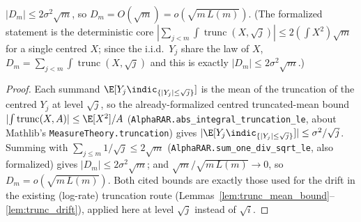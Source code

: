 \begin{lemma}\label{lem:hw_drift}
\leanok
{}
$|D_m|\le2\sigma^2\sqrt m$, so $D_m=O(\sqrt m)=o(\sqrt{m\,L(m)})$. (The formalized statement is the
deterministic core $|\sum_{j<m}\!\int\operatorname{trunc}(X,\sqrt j)|\le2(\int X^2)\sqrt m$ for a
single centred $X$; since the i.i.d.\ $Y_j$ share the law of $X$, $D_m=\sum_{j<m}\!\int
\operatorname{trunc}(X,\sqrt j)$ and this is exactly $|D_m|\le2\sigma^2\sqrt m$.)
\end{lemma}
\begin{proof}\leanok
Each summand $\E[Y_j\indic_{\{|Y_j|\le\sqrt j\}}]$ is the mean of the truncation of the
centred $Y_j$ at level $\sqrt j$, so the already-formalized centred truncated-mean bound
$|\!\int\operatorname{trunc}(X,A)|\le\E[X^2]/A$
(\texttt{AlphaRAR.abs\_integral\_truncation\_le}, about Mathlib's
\texttt{MeasureTheory.truncation}) gives $|\E[Y_j\indic_{\{|Y_j|\le\sqrt j\}}]|\le
\sigma^2/\sqrt j$. Summing with $\sum_{j\le m}1/\sqrt j\le2\sqrt m$
(\texttt{AlphaRAR.sum\_one\_div\_sqrt\_le}, also formalized) gives $|D_m|\le2\sigma^2
\sqrt m$; and $\sqrt m/\sqrt{m\,L(m)}\to0$, so $D_m=o(\sqrt{m\,L(m)})$. Both cited bounds
are exactly those used for the drift in the existing (log-rate) truncation route
(Lemmas~\ref{lem:trunc_mean_bound}--\ref{lem:trunc_drift}), applied here at level
$\sqrt j$ instead of $\sqrt i$.
\end{proof}

